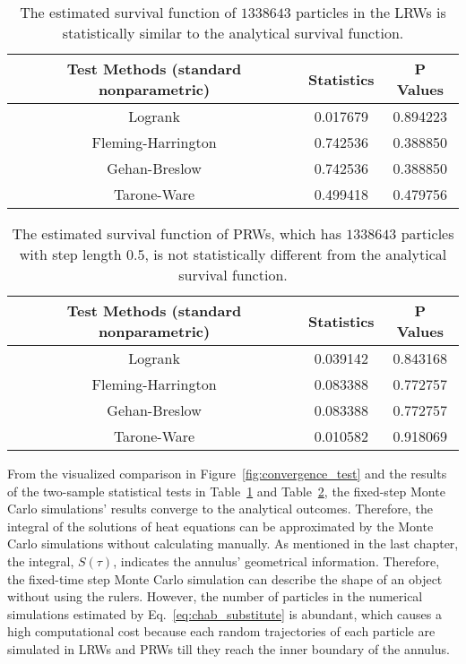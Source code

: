 \begin{table}
  \centering
  \begin{tabular}{|c|c|c|}\hline
    Test Methods (standard nonparametric) & Statistics & P Values \\
    \hline
    Logrank & 0.017679 & 0.894223 \\
    \hline
    Fleming-Harrington & 0.742536 & 0.388850 \\
    \hline
    Gehan-Breslow & 0.742536 & 0.388850 \\
    \hline
    Tarone-Ware & 0.499418 & 0.479756 \\
    \hline
  \end{tabular}
  \caption{The estimated survival function of $1338643$ particles in
    the LRWs is statistically similar to the analytical survival
    function.}
  \label{tab:two_sample_test_lrws_analytical}
\end{table}

\begin{table}
  \centering
  \begin{tabular}{|c|c|c|}\hline
    Test Methods (standard nonparametric) & Statistics & P Values \\
    \hline
    Logrank & 0.039142 & 0.843168 \\
    \hline
    Fleming-Harrington & 0.083388 & 0.772757 \\
    \hline
    Gehan-Breslow & 0.083388 & 0.772757 \\
    \hline
    Tarone-Ware & 0.010582 & 0.918069 \\
    \hline
  \end{tabular}
  \caption{The estimated survival function of PRWs, which has
    $1338643$ particles with step length $0.5$, is not statistically
    different from the analytical survival function.}
  \label{tab:two_sample_test_prws_analytical}
\end{table}

From the visualized comparison in Figure~\ref{fig:convergence_test}
and the results of the two-sample statistical tests in
Table~\ref{tab:two_sample_test_lrws_analytical} and
Table~\ref{tab:two_sample_test_prws_analytical}, the fixed-step Monte
Carlo simulations' results converge to the analytical
outcomes. Therefore, the integral of the solutions of heat equations
can be approximated by the Monte Carlo simulations without calculating
manually. As mentioned in the last chapter, the integral, $S(\tau)$,
indicates the annulus' geometrical information. Therefore, the
fixed-time step Monte Carlo simulation can describe the shape of an
object without using the rulers. However, the number of particles in
the numerical simulations estimated by Eq.~\ref{eq:chab_substitute} is
abundant, which causes a high computational cost because each random
trajectories of each particle are simulated in LRWs and PRWs till they
reach the inner boundary of the annulus.


